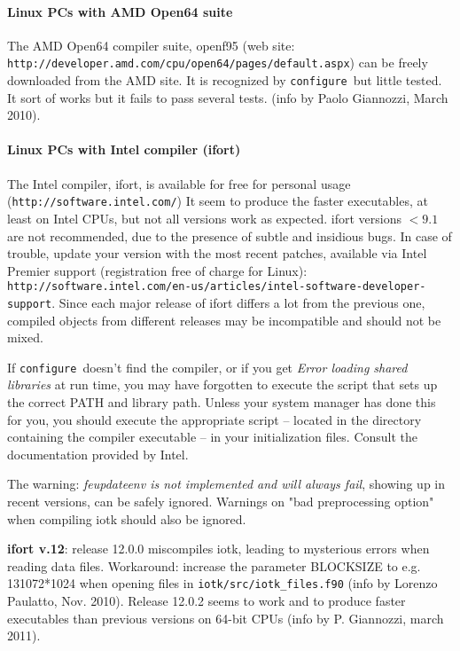 \documentclass[12pt,a4paper]{article}
\def\configure{\texttt{configure}}
\begin{document}
\paragraph{Linux PCs with AMD Open64 suite}

The AMD Open64 compiler suite, openf95 (web site:
\texttt{http://developer.amd.com/cpu/open64/pages/default.aspx})
can be freely downloaded from the AMD site.
It is recognized by \configure\ but little tested. It sort of works 
but it fails to pass several tests.
(info by Paolo Giannozzi, March 2010).

\paragraph{Linux PCs with Intel compiler (ifort)}

The Intel compiler, ifort, is available for  free for personal 
usage (\texttt{http://software.intel.com/})  It seem to produce the faster executables, 
at least on Intel CPUs, but not all versions work as expected.
ifort versions $<9.1$ are not recommended, due to the presence of subtle 
and insidious bugs. In case of trouble, update your version with 
the most recent patches,
available via Intel Premier support (registration free of charge for Linux):
\texttt{http://software.intel.com/en-us/articles/intel-software-developer-support}.
Since each major release of ifort
differs a lot from the previous one, compiled objects from different 
releases may be incompatible and should not be mixed.    

If \configure\ doesn't find the compiler, or if you get 
{\em Error loading shared libraries} at run time, you may have 
forgotten to execute the script that
sets up the correct PATH and library path. Unless your system manager has
done this for you, you should execute the appropriate script -- located in
the directory containing the compiler executable -- in your
initialization files. Consult the documentation provided by Intel. 
    
The warning: {\em feupdateenv is not implemented and will always fail}, 
showing up in recent versions, can be safely ignored. Warnings on
"bad preprocessing option" when compiling iotk should also be ignored.

{\bf ifort v.12}: release 12.0.0 miscompiles iotk, leading to 
mysterious errors when reading data files. Workaround: increase 
the parameter BLOCKSIZE to e.g. 131072*1024 when opening files in 
\texttt{iotk/src/iotk\_files.f90} (info by Lorenzo Paulatto,
Nov. 2010). Release 12.0.2 seems to work and to produce faster executables
than previous versions on 64-bit CPUs (info by P. Giannozzi, march 2011).
\end{document}
